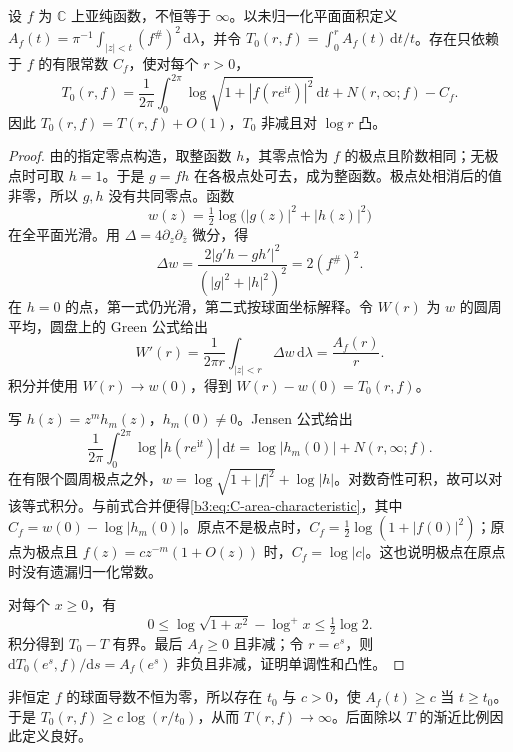 \begin{proposition}[面积特征与对数特征]\label{b3:prop:C-area-characteristic}
设 \(f\) 为 \(\mathbb C\) 上亚纯函数，不恒等于 \(\infty\)。以未归一化平面面积定义 \(A_f(t)=\pi^{-1}\int_{|z|<t}(f^\#)^2\,\mathrm{d}\lambda\)，并令 \(T_0(r,f)=\int_0^r A_f(t)\,\mathrm{d}t/t\)。存在只依赖于 \(f\) 的有限常数 \(C_f\)，使对每个 \(r>0\)，
\begin{equation}\label{b3:eq:C-area-characteristic}
 T_0(r,f)=\frac1{2\pi}\int_0^{2\pi}
       \log\sqrt{1+|f(re^{\mathrm{i}t})|^2}\,\mathrm{d}t
       +N(r,\infty;f)-C_f.
\end{equation}
因此 \(T_0(r,f)=T(r,f)+O(1)\)，\(T_0\) 非减且对 \(\log r\) 凸。
\end{proposition}
\begin{proof}
由的指定零点构造，取整函数 \(h\)，其零点恰为 \(f\) 的极点且阶数相同；无极点时可取 \(h=1\)。于是 \(g=fh\) 在各极点处可去，成为整函数。极点处相消后的值非零，所以 \(g,h\) 没有共同零点。函数
\[
 w(z)=\tfrac12\log\bigl(|g(z)|^2+|h(z)|^2\bigr)
\]
在全平面光滑。用 \(\Delta=4\partial_z\partial_{\overline z}\) 微分，得
\[
 \Delta w=\frac{2|g'h-gh'|^2}{(|g|^2+|h|^2)^2}=2(f^\#)^2.
\]
在 \(h=0\) 的点，第一式仍光滑，第二式按球面坐标解释。令 \(W(r)\) 为 \(w\) 的圆周平均，圆盘上的 Green 公式给出
\[
 W'(r)=\frac1{2\pi r}\int_{|z|<r}\Delta w\,\mathrm{d}\lambda
       =\frac{A_f(r)}r.
\]
积分并使用 \(W(r)\to w(0)\)，得到 \(W(r)-w(0)=T_0(r,f)\)。

写 \(h(z)=z^m h_m(z)\)，\(h_m(0)\ne0\)。Jensen 公式给出
\[
 \frac1{2\pi}\int_0^{2\pi}\log|h(re^{\mathrm{i}t})|\,\mathrm{d}t
 =\log|h_m(0)|+N(r,\infty;f).
\]
在有限个圆周极点之外，\(w=\log\sqrt{1+|f|^2}+\log|h|\)。对数奇性可积，故可以对该等式积分。与前式合并便得\eqref{b3:eq:C-area-characteristic}，其中
\(C_f=w(0)-\log|h_m(0)|\)。原点不是极点时，\(C_f=\tfrac12\log(1+|f(0)|^2)\)；原点为极点且 \(f(z)=c z^{-m}(1+O(z))\) 时，\(C_f=\log|c|\)。这也说明极点在原点时没有遗漏归一化常数。

对每个 \(x\ge0\)，有
\[
 0\le\log\sqrt{1+x^2}-\log^+x\le\tfrac12\log2.
\]
积分得到 \(T_0-T\) 有界。最后 \(A_f\ge0\) 且非减；令 \(r=e^s\)，则 \(\mathrm dT_0(e^s,f)/\mathrm ds=A_f(e^s)\) 非负且非减，证明单调性和凸性。
\end{proof}

非恒定 \(f\) 的球面导数不恒为零，所以存在 \(t_0\) 与 \(c>0\)，使 \(A_f(t)\ge c\) 当 \(t\ge t_0\)。于是 \(T_0(r,f)\ge c\log(r/t_0)\)，从而 \(T(r,f)\to\infty\)。后面除以 \(T\) 的渐近比例因此定义良好。

